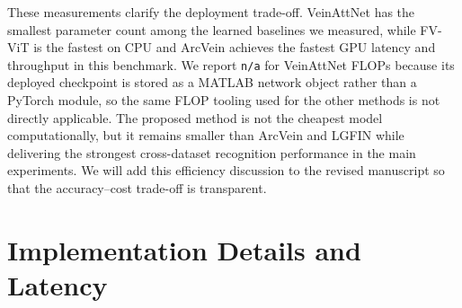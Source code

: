 \documentclass[11pt]{article}
\begin{document}
\begin{table}[ht!]
    \centering
    \scriptsize
    \caption{Runtime and computational-cost comparison on FV-300 using batch size $1$. Lower latency is better; higher throughput is better.}
    \label{tab:rebuttal_runtime}
\end{table}

These measurements clarify the deployment trade-off. VeinAttNet has the smallest parameter count among the learned baselines we measured, while FV-ViT is the fastest on CPU and ArcVein achieves the fastest GPU latency and throughput in this benchmark. We report \texttt{n/a} for VeinAttNet FLOPs because its deployed checkpoint is stored as a MATLAB network object rather than a PyTorch module, so the same FLOP tooling used for the other methods is not directly applicable. The proposed method is not the cheapest model computationally, but it remains smaller than ArcVein and LGFIN while delivering the strongest cross-dataset recognition performance in the main experiments. We will add this efficiency discussion to the revised manuscript so that the accuracy--cost trade-off is transparent.

\section*{Implementation Details and Latency}
\end{document}

